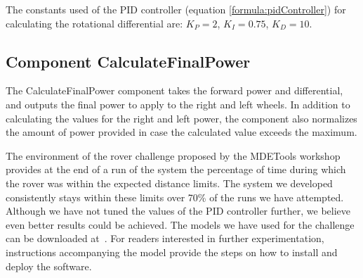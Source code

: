 The constants used of the PID controller (equation
\ref{formula:pidController}) for calculating the rotational differential are:
$K_P = 2$, $K_I=0.75$, $K_D=10$.

\subsection{Component CalculateFinalPower}
The \textsf{CalculateFinalPower} component takes the forward power and
 differential, and outputs the final power to apply to the
right and left wheels.
In addition to calculating the values for the right and left power, the
component also normalizes the amount of power provided in case the calculated
value exceeds the maximum.

The environment of the rover challenge proposed by the MDETools workshop
provides at the end of a run of the system  the percentage of time during which the rover was within the
expected distance limits. The system we developed consistently
stays within these limits over 70\% of the runs we have attempted. Although we
have not tuned the values of the PID controller further, we believe even better results could be achieved.
The \af models we have used for the challenge can be downloaded
at~\cite{af3_mdetools}. For readers interested in further experimentation,
instructions accompanying the model provide the steps on how to install and
deploy the software.
